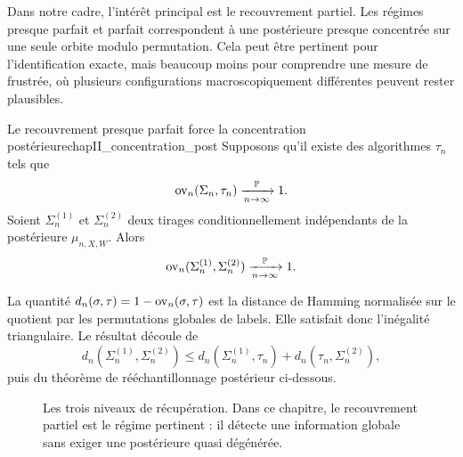 Dans notre cadre, l'intérêt principal est le recouvrement partiel. Les régimes presque parfait et parfait correspondent à une postérieure presque concentrée sur une seule orbite modulo permutation. Cela peut être pertinent pour l'identification exacte, mais beaucoup moins pour comprendre une mesure de  frustrée, où plusieurs configurations macroscopiquement différentes peuvent rester plausibles.

\begin{Fait}{Le recouvrement presque parfait force la concentration postérieure}{chapII_concentration_post}
Supposons qu'il existe des algorithmes $\tau_n$ tels que
\[
    \operatorname{ov}_n(\Sigma_n,\tau_n)\xrightarrow[n\to\infty]{\mathbb P}1.
\]
Soient $\Sigma_n^{(1)}$ et $\Sigma_n^{(2)}$ deux tirages conditionnellement indépendants de la postérieure $\mu_{n,X,W}$. Alors
\begin{equation}
    \operatorname{ov}_n(\Sigma_n^{(1)},\Sigma_n^{(2)})\xrightarrow[n\to\infty]{\mathbb P}1.
    \label{eq:chapII_posterior_concentration}
\end{equation}
\end{Fait}

\begin{Preuve}
La quantité $d_n(\sigma,\tau)=1-\operatorname{ov}_n(\sigma,\tau)$ est la distance de Hamming normalisée sur le quotient par les permutations globales de labels. Elle satisfait donc l'inégalité triangulaire. Le résultat découle de
\[
    d_n(\Sigma_n^{(1)},\Sigma_n^{(2)})
    \le
    d_n(\Sigma_n^{(1)},\tau_n)+d_n(\tau_n,\Sigma_n^{(2)}),
\]
puis du théorème de rééchantillonnage postérieur ci-dessous.
\end{Preuve}

\begin{figure}[H]
\centering
{}
\caption{Les trois niveaux de récupération. Dans ce chapitre, le recouvrement partiel est le régime pertinent : il détecte une information globale sans exiger une postérieure quasi dégénérée.}
\label{fig:chapII_recovery_regimes}
\end{figure}


